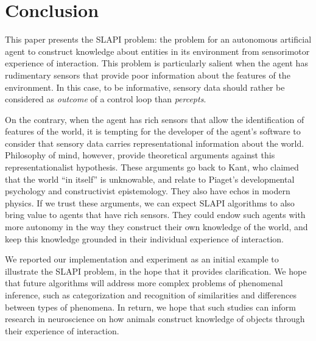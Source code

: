 \documentclass[pmlr]{jmlr}%
\begin{document}
\section{Conclusion}

This paper presents the SLAPI problem: the problem for an autonomous artificial agent to construct knowledge about entities in its environment from sensorimotor experience of interaction.  
This problem is particularly salient when the agent has rudimentary sensors that provide poor information about the features of the environment. 
In this case, to be informative, sensory data should rather be considered as \textit{outcome} of a control loop than \textit{percepts}.

On the contrary, when the agent has rich sensors that allow the identification of features of the world, it is tempting for the developer of the agent's software to consider that sensory data carries representational information about the world. 
Philosophy of mind, however, provide theoretical arguments against this representationalist hypothesis. 
These arguments go back to Kant, who claimed that the world ``in itself'' is unknowable, and relate to Piaget's developmental psychology and constructivist epistemology. 
They also have echos in modern physics. 
If we trust these arguments, we can expect SLAPI algorithms to also bring value to agents that have rich sensors. 
They could endow such agents with more autonomy in the way they construct their own knowledge of the world, and keep this knowledge grounded in their individual experience of interaction.

We reported our implementation and experiment as an initial example to illustrate the SLAPI problem, in the hope that it provides clarification. 
We hope that future algorithms will address more complex problems of phenomenal inference, such as categorization and recognition of similarities and differences between types of phenomena. 
In return, we hope that such studies can inform research in neuroscience on how animals construct knowledge of objects through their experience of interaction.


\end{document}
